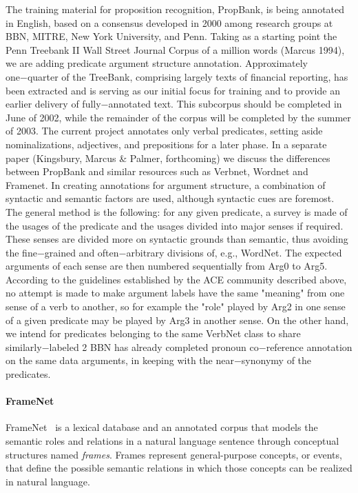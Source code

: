   The training material for proposition recognition, PropBank, is being annotated in English, based on a consensus developed in 2000 among research groups at BBN, MITRE, New York University, and Penn. Taking as a starting point the Penn Treebank II Wall Street Journal Corpus of a million words (Marcus 1994), we are adding predicate argument structure annotation. Approximately one−quarter of the TreeBank, comprising largely texts of financial reporting, has been extracted and is serving as our initial focus for training and to provide an earlier delivery of fully−annotated text. This subcorpus should be completed in June of 2002, while the remainder of the corpus will be completed by the summer of 2003. The current project annotates only verbal predicates, setting aside nominalizations, adjectives, and prepositions for a later phase. In a separate paper (Kingsbury, Marcus \& Palmer, forthcoming) we discuss the differences between PropBank and similar resources such as Verbnet, Wordnet and Framenet. In creating annotations for argument structure, a combination of syntactic and semantic factors are used, although syntactic cues are foremost. The general method is the following: for any given predicate, a survey is made of the usages of the predicate and the usages divided into major senses if required. These senses are divided more on syntactic grounds than semantic, thus avoiding the fine−grained and often−arbitrary divisions of, e.g., WordNet. The expected arguments of each sense are then numbered sequentially from Arg0 to Arg5. According to the guidelines established by the ACE community described above, no attempt is made to make argument labels have the same "meaning" from one sense of a verb to another, so for example the "role" played by Arg2 in one sense of a given predicate may be played by Arg3 in another sense. On the other hand, we intend for  predicates belonging to the same VerbNet class to share similarly−labeled 2 BBN has already completed pronoun co−reference annotation on the same data arguments, in keeping with the near−synonymy of the predicates.

\paragraph{FrameNet}

  FrameNet~\cite{framenet} is a lexical database and an annotated corpus that models the semantic roles and relations in a natural language sentence through conceptual structures named \textit{frames}. Frames represent general-purpose concepts, or events, that define the possible semantic relations in which those concepts can be realized in natural language.

